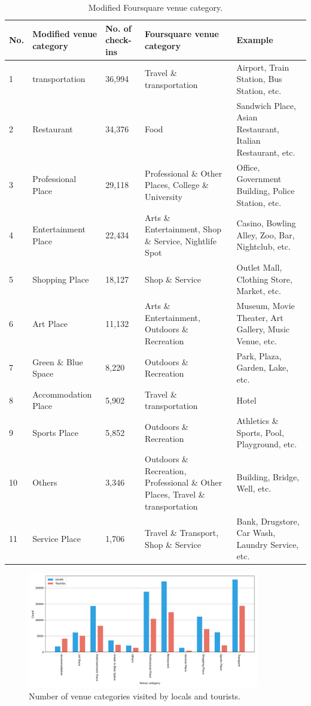 \documentclass{article}
\theoremstyle{remark}
\begin{document}
\begin{table}[h!]
\centering
\caption{\label{tab:modified_category}Modified Foursquare venue category.}
\begin{adjustbox}{max width=\textwidth, margin=0cm}
\begin{tabular}{lllp{6cm}p{5cm}} \hline
No. & Modified venue category & No. of check-ins & Foursquare venue category 
& Example \\ \hline
1 & transportation & 36,994 & Travel \& transportation & Airport, Train Station, Bus Station, etc. \\
2 & Restaurant & 34,376 & Food & Sandwich Place, Asian Restaurant, Italian Restaurant, etc. \\
3 & Professional Place & 29,118 & Professional \& Other Places, College \& University & Office, Government Building, Police Station, etc. \\
4 & Entertainment Place & 22,434 & Arts \& Entertainment, Shop \& Service, Nightlife Spot & Casino, Bowling Alley, Zoo, Bar, Nightclub, etc. \\
5 & Shopping Place & 18,127 & Shop \& Service & Outlet Mall, Clothing Store, Market, etc. \\
6 & Art Place & 11,132 & Arts \& Entertainment, Outdoors \& Recreation & Museum, Movie Theater, Art Gallery, Music Venue, etc. \\
7 & Green \& Blue Space & 8,220 & Outdoors \& Recreation & Park, Plaza, Garden, Lake, etc. \\
8 & Accommodation Place & 5,902 & Travel \& transportation & Hotel \\
9 & Sports Place & 5,852 & Outdoors \& Recreation & Athletics \& Sports, Pool, Playground, etc. \\
10 & Others & 3,346 & Outdoors \& Recreation, Professional \& Other Places, Travel \& transportation & Building, Bridge, Well, etc. \\
11 & Service Place & 1,706 & Travel \& Transport, Shop \& Service & Bank, Drugstore, Car Wash, Laundry Service, etc. \\ \hline
\end{tabular}
\end{adjustbox}
\end{table}


\begin{figure}[h!]
\centering
\includegraphics[width=0.9\textwidth]{figures/foursquare_category.png}
\caption{\label{fig:foursquare_category}Number of venue categories visited by locals and tourists.}
\end{figure}
\end{document}
